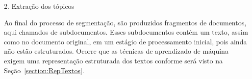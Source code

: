 2. Extração dos tópicos


















Ao final do processo de segmentação, são produzidos fragmentos de documentos, aqui chamados de subdocumentos. Esses subdocumentos contém um texto, assim como no documento original, em um estágio de processamento inicial, pois ainda não estão estruturados. Ocorre que as técnicas de aprendizado de máquina exigem uma representação estruturada dos textos conforme será visto na Seção~\ref{section:RepTextos}.







